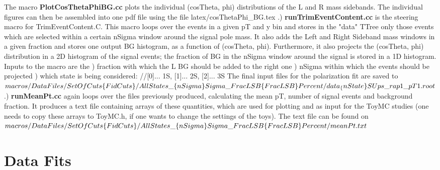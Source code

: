 \documentclass{article}
\begin{document}
The macro {\bf PlotCosThetaPhiBG.cc} plots the individual (cosTheta,
phi) distributions of the L and R mass sidebands. The individual
figures can then be assembled into one pdf file using the file 
latex/cosThetaPhi\_BG.tex
\newline
{}.) {\bf runTrimEventContent.cc} is the steering macro for
TrimEventContent.C. This macro loops over the events in a given pT and
y bin and stores in the "data" TTree only those events which are
selected within a certain nSigma window around the signal pole mass. It
also adds the Left and Right Sideband mass windows in a given fraction
and stores one output BG histogram, as a function of (cosTheta,
phi). Furthermore, it also projects the (cosTheta, phi) distribution
in a 2D histogram of the signal events; the fraction of BG in the
nSigma window around the signal is stored in a 1D histogram. Inputs to
the macro are the 
 \newline   *) fraction with which the L BG should be added to the right one
 \newline   *) nSigma within which the events should be projected
 \newline   *) which state is being considered: //[0]... 1S, [1]... 2S, [2]... 3S
The final input files for the polarization fit are saved to
\newline
\newline
$macros/DataFiles/SetOfCuts\{FidCuts\}/\\AllStates\_\{nSigma\}Sigma\_FracLSB\{FracLSB\}Percent/data_\{nState\}SUps\_rap1\_pT1.root$
\newline
{}.) {\bf runMeanPt.cc} again loops over the files previously produced, calculating the mean pT, number of signal events and background fraction. It produces a text file containing arrays of these quantities, which are used for plotting and as input for the ToyMC studies (one needs to copy these arrays to ToyMC.h, if one wants to change the settings of the toys). The text file can be found on
\newline
\newline
$macros/DataFiles/SetOfCuts\{FidCuts\}/\\AllStates\_\{nSigma\}Sigma\_FracLSB\{FracLSB\}Percent/meanPt.txt$



\section{Data Fits}
\end{document}
